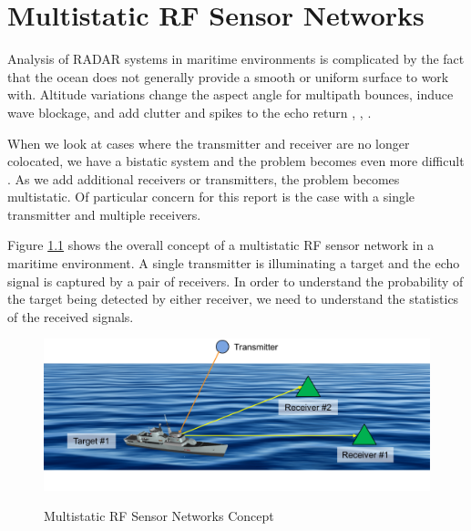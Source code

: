 \renewcommand{\baselinestretch}{2} \small\normalsize
\chapter{Multistatic RF Sensor Networks}
Analysis of RADAR systems in maritime environments is complicated by the fact that the ocean does not generally provide a smooth or uniform surface to work with. Altitude variations change the aspect angle for multipath bounces, induce wave blockage, and add clutter and spikes to the echo return \cite{skolnik_handbook}, \cite{blake_radar}, \cite{nathanson_radar}.

When we look at cases where the transmitter and receiver are no longer colocated, we have a bistatic system and the problem becomes even more difficult \cite{willis_bistatic}. As we add additional receivers or transmitters, the problem becomes multistatic. Of particular concern for this report is the case with a single transmitter and multiple receivers.

Figure \ref{ms_fig:1} shows the overall concept of a multistatic RF sensor network in a maritime environment. A single transmitter is illuminating a target and the echo signal is captured by a pair of receivers. In order to understand the probability of the target being detected by either receiver, we need to understand the statistics of the received signals.

\begin{figure}[H]
  \begin{center}
\includegraphics[width=5in]{../media/multistatic/ms_rf_concept.png}
  \end{center}
  \renewcommand{\baselinestretch}{1} \small\normalsize
  \begin{quote}
    \caption[Multistatic RF Sensor Networks Concept]{Multistatic RF Sensor Networks Concept\label{ms_fig:1}}
  \end{quote}
\end{figure}
\renewcommand{\baselinestretch}{2} \small\normalsize

